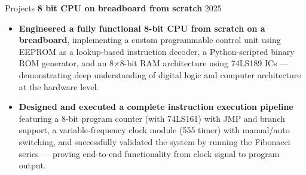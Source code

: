 \documentclass[10pta]{resume} %
\begin{document}
\begin{rSection}{Projects}
\textbf{8 bit CPU on breadboard from scratch} \hfill 2025
 \begin{itemize}
    \item \textbf{Engineered a fully functional 8-bit CPU from scratch on a breadboard}, implementing a custom programmable control unit using EEPROM as a lookup-based instruction decoder, a Python-scripted binary ROM generator, and an 8×8-bit RAM architecture using 74LS189 ICs — demonstrating deep understanding of digital logic and computer architecture at the hardware level.
    \item \textbf{Designed and executed a complete instruction execution pipeline} featuring a 8-bit program counter (with 74LS161) with JMP and branch support, a variable-frequency clock module (555 timer) with manual/auto switching, and successfully validated the system by running the Fibonacci series — proving end-to-end functionality from clock signal to program output.
\end{itemize}

 


\end{rSection}
\end{document}
